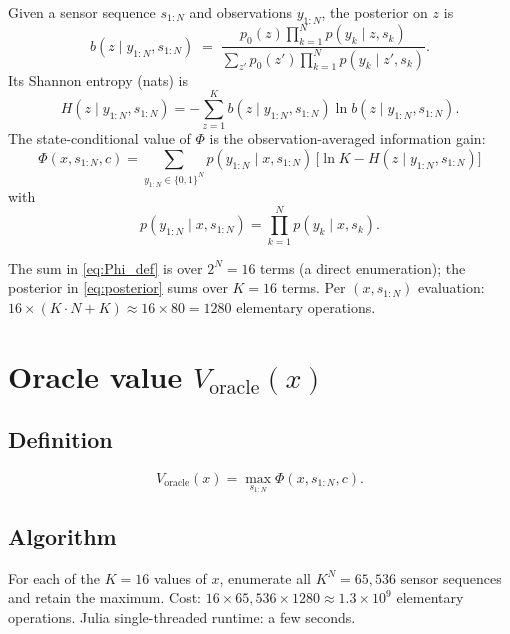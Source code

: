 \documentclass[11pt,a4paper]{article}
\begin{document}
Given a sensor sequence $s_{1:N}$ and observations $y_{1:N}$, the posterior on $z$ is
\begin{equation}
  b(z \mid y_{1:N}, s_{1:N}) \;=\; \frac{p_0(z) \prod_{k=1}^N p(y_k \mid z, s_k)}{\sum_{z'} p_0(z') \prod_{k=1}^N p(y_k \mid z', s_k)}.
  \label{eq:posterior}
\end{equation}
Its Shannon entropy (nats) is
\begin{equation}
  H(z \mid y_{1:N}, s_{1:N}) = -\sum_{z=1}^K b(z \mid y_{1:N}, s_{1:N}) \ln b(z \mid y_{1:N}, s_{1:N}).
  \label{eq:entropy}
\end{equation}
The state-conditional value of $\Phi$ is the observation-averaged information gain:
\begin{equation}
  \Phi(x, s_{1:N}, c) = \sum_{y_{1:N} \in \{0,1\}^N} p(y_{1:N} \mid x, s_{1:N}) \,\bigl[\ln K - H(z \mid y_{1:N}, s_{1:N})\bigr]
  \label{eq:Phi_def}
\end{equation}
with
\begin{equation}
  p(y_{1:N} \mid x, s_{1:N}) = \prod_{k=1}^N p(y_k \mid x, s_k).
\end{equation}

The sum in \eqref{eq:Phi_def} is over $2^N = 16$ terms (a direct enumeration); the posterior in \eqref{eq:posterior} sums over $K = 16$ terms.  Per $(x, s_{1:N})$ evaluation: $16 \times (K \cdot N + K) \approx 16 \times 80 = 1280$ elementary operations.

\section{Oracle value $V_{\text{oracle}}(x)$}

\subsection{Definition}
\[
  V_{\text{oracle}}(x) = \max_{s_{1:N}} \Phi(x, s_{1:N}, c).
\]

\subsection{Algorithm}
For each of the $K = 16$ values of $x$, enumerate all $K^N = 65{,}536$ sensor sequences and retain the maximum.  Cost: $16 \times 65{,}536 \times 1280 \approx 1.3 \times 10^9$ elementary operations.  Julia single-threaded runtime: a few seconds.
\end{document}
